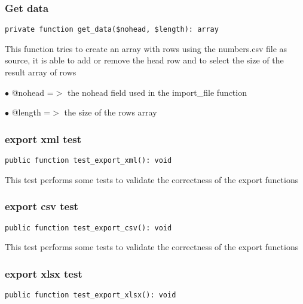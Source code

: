 \documentclass[a4paper]{article}
\begin{document}
\hypertarget{toc157}{}
\subsubsection{Get data}

\begin{lstlisting}
private function get_data($nohead, $length): array
\end{lstlisting}

This function tries to create an array with rows using the numbers.csv file
as source, it is able to add or remove the head row and to select the size
of the result array of rows

\begin{compactitem}
\item[\color{myblue}$\bullet$] @nohead =$>$ the nohead field used in the import\_file function
\item[\color{myblue}$\bullet$] @length =$>$ the size of the rows array
\end{compactitem}

\hypertarget{toc158}{}
\subsubsection{export xml test}

\begin{lstlisting}
public function test_export_xml(): void
\end{lstlisting}

This test performs some tests to validate the correctness
of the export functions

\hypertarget{toc159}{}
\subsubsection{export csv test}

\begin{lstlisting}
public function test_export_csv(): void
\end{lstlisting}

This test performs some tests to validate the correctness
of the export functions

\hypertarget{toc160}{}
\subsubsection{export xlsx test}

\begin{lstlisting}
public function test_export_xlsx(): void
\end{lstlisting}
\end{document}
